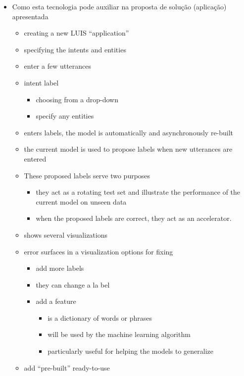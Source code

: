 \begin{itemize}
	\item Como esta tecnologia pode auxiliar na proposta de solução (aplicação) apresentada
		\begin{itemize}
			\item creating a new LUIS “application”
			\item specifying the intents and entities
			\item enter a few utterances
			\item intent label
				\begin{itemize}
					\item choosing from a drop-down
					\item specify any entities
				\end{itemize}

			\item enters labels, the model is automatically and asynchronously re-built
			\item the current model is used to propose labels when new utterances are entered
			\item These proposed labels serve two purposes
				\begin{itemize}
					\item they act as a rotating test set and illustrate the performance of the current model on unseen data
					\item when the proposed labels are correct, they act as an accelerator.
				\end{itemize}
			\item shows several visualizations
			\item error surfaces in a visualization options for fixing
				\begin{itemize}
					\item add more labels
					\item they can change a la bel
					\item add a feature
						\begin{itemize}
							\item is a dictionary of words or phrases
							\item will be used by the machine learning algorithm
							\item particularly useful for helping the models to generalize
						\end{itemize}
				\end{itemize}
			\item add “pre-built” ready-to-use
				\begin{itemize}

\end{itemize}
\end{itemize}
\end{itemize}
